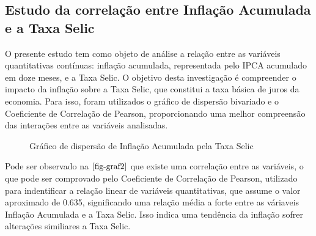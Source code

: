 \documentclass[
]{estat/estat}
\begin{document}
\subsection{Estudo da correlação entre Inflação Acumulada e a Taxa
Selic}\label{estudo-da-correlauxe7uxe3o-entre-inflauxe7uxe3o-acumulada-e-a-taxa-selic}

O presente estudo tem como objeto de análise a relação entre as
variáveis quantitativas contínuas: inflação acumulada, representada pelo
IPCA acumulado em doze meses, e a Taxa Selic. O objetivo desta
investigação é compreender o impacto da inflação sobre a Taxa Selic, que
constitui a taxa básica de juros da economia. Para isso, foram
utilizados o gráfico de dispersão bivariado e o Coeficiente de
Correlação de Pearson, proporcionando uma melhor compreensão das
interações entre as variáveis analisadas.

\begin{figure}[H]

\caption{\label{fig-graf2}Gráfico de dispersão de Inflação Acumulada
pela Taxa Selic}


\end{figure}%

Pode ser observado na \(\ref{fig-graf2}\) que existe uma correlação
entre as variáveis, o que pode ser comprovado pelo Coeficiente de
Correlação de Pearson, utilizado para indentificar a relação linear de
variáveis quantitativas, que assume o valor aproximado de 0.635,
significando uma relação média a forte entre as váriaveis Inflação
Acumulada e a Taxa Selic. Isso indica uma tendência da inflação sofrer
alterações similiares a Taxa Selic.
\end{document}
